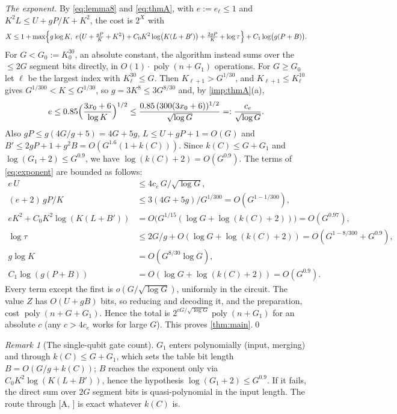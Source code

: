 \documentclass[10pt]{amsart}
\theoremstyle{plain}
\theoremstyle{definition}
\theoremstyle{remark}
\newtheorem{remark}[theorem]{Remark}
\numberwithin{equation}{section}
\newcommand{\poly}{\operatorname{poly}}
\newcommand{\A}[1][]{\textup{[A\if\relax\detokenize{#1}\relax\else, #1\fi]}}
\begin{document}
\emph{The exponent.} By \eqref{eq:lemma8} and \eqref{eq:thmA}, with $e:=e_\ell\le1$ and
$K^2L\le U+gP/K+K^2$, the cost is $2^X$ with
\begin{equation}\label{eq:exponent}
  X\le1+\max\Bigl\{g\log K,\ e\bigl(U+\tfrac{gP}{K}+K^2\bigr)+C_0K^2\log\bigl(K(L+B')\bigr)+\tfrac{2gP}{K}+\log\tau\Bigr\}
  +C_1\log\bigl(g(P+B)\bigr).
\end{equation}
For $G<G_0:=K_0^{30}$, an absolute constant, the algorithm instead sums over the $\le2G$ segment
bits directly, in $O(1)\cdot\poly(n+G_1)$ operations. For $G\ge G_0$ let $\ell$ be the largest
index with $K_\ell^{30}\le G$. Then $K_{\ell+1}>G^{1/30}$, and $K_{\ell+1}\le K_\ell^{10}$ gives
$G^{1/300}<K\le G^{1/30}$, so $g=3K^8\le3G^{8/30}$ and, by \cref{imp:thmA}(a),
\[
  e\le0.85\Bigl(\frac{3x_0+6}{\log K}\Bigr)^{1/2}\le\frac{0.85\,(300(3x_0+6))^{1/2}}{\sqrt{\log G}}=:\frac{c_e}{\sqrt{\log G}}.
\]
Also $gP\le g(4G/g+5)=4G+5g$, $L\le U+gP+1=O(G)$ and
$B'\le2gP+1+g^2B=O(G^{1.6}(1+k(C)))$. Since $k(C)\le G+G_1$ and $\log(G_1+2)\le G^{0.9}$, we have
$\log(k(C)+2)=O(G^{0.9})$. The terms of \eqref{eq:exponent} are bounded as follows:
\begin{align*}
  e\,U&\le4c_e\,G/\sqrt{\log G},\\
  (e+2)\,gP/K&\le3(4G+5g)/G^{1/300}=O(G^{1-1/300}),\\
  eK^2+C_0K^2\log(K(L+B'))&=O\bigl(G^{1/15}(\log G+\log(k(C)+2))\bigr)=O(G^{0.97}),\\
  \log\tau&\le2G/g+O(\log G+\log(k(C)+2))=O(G^{1-8/300}+G^{0.9}),\\
  g\log K&=O(G^{8/30}\log G),\\
  C_1\log(g(P+B))&=O(\log G+\log(k(C)+2))=O(G^{0.9}).
\end{align*}
Every term except the first is $o(G/\sqrt{\log G})$, uniformly in the circuit. The value $Z$ has
$O(U+gB)$ bits, so reducing and decoding it, and the preparation, cost $\poly(n+G+G_1)$. Hence the
total is $2^{cG/\sqrt{\log G}}\poly(n+G_1)$ for an absolute $c$ (any $c>4c_e$ works for large
$G$). This proves \cref{thm:main}.\qed

\begin{remark}[The single-qubit gate count]\label{rem:G1}
$G_1$ enters polynomially (input, merging) and through $k(C)\le G+G_1$, which sets the table bit
length $B=O(G/g+k(C))$; $B$ reaches the exponent only via $C_0K^2\log(K(L+B'))$, hence the
hypothesis $\log(G_1+2)\le G^{0.9}$. If it fails, the direct sum over $2G$ segment bits is
quasi-polynomial in the input length. The route through \A{} is exact whatever $k(C)$ is.
\end{remark}
\end{document}

